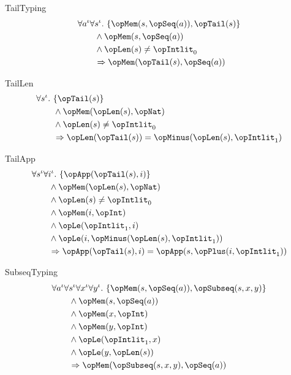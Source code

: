 \documentclass[11pt, a4paper, oneside]{article}
\begin{document}
\begin{axioms}
\item[TailTyping] \[
        \begin{aligned}
            &\forall a^\idv \forall s^\idv.\, \st{ \opMem(s, \opSeq(a)), \opTail(s) } \\
            &\qquad \wedge \opMem(s, \opSeq(a)) \\
            &\qquad \wedge \opLen(s) \neq \opIntlit_0 \\
            &\qquad \imp \opMem(\opTail(s), \opSeq(a))
        \end{aligned}
    \]

\item[TailLen] \[
        \begin{aligned}
            &\forall s^\idv.\, \st{ \opTail(s) } \\
            &\qquad \wedge \opMem(\opLen(s), \opNat) \\
            &\qquad \wedge \opLen(s) \neq \opIntlit_0 \\
            &\qquad \imp \opLen(\opTail(s)) = \opMinus(\opLen(s), \opIntlit_1)
        \end{aligned}
    \]

\item[TailApp] \[
        \begin{aligned}
            &\forall s^\idv \forall i^\idv.\, \st{ \opApp(\opTail(s), i) } \\
            &\qquad \wedge \opMem(\opLen(s), \opNat) \\
            &\qquad \wedge \opLen(s) \neq \opIntlit_0 \\
            &\qquad \wedge \opMem(i, \opInt) \\
            &\qquad \wedge \opLe(\opIntlit_1, i) \\
            &\qquad \wedge \opLe(i, \opMinus(\opLen(s), \opIntlit_1)) \\
            &\qquad \imp \opApp(\opTail(s), i) = \opApp(s, \opPlus(i, \opIntlit_1))
        \end{aligned}
    \]

\item[SubseqTyping] \[
        \begin{aligned}
            &\forall a^\idv \forall s^\idv \forall x^\idv \forall y^\idv.\, \st{ \opMem(s, \opSeq(a)), \opSubseq(s, x, y) } \\
            &\qquad \wedge \opMem(s, \opSeq(a)) \\
            &\qquad \wedge \opMem(x, \opInt) \\
            &\qquad \wedge \opMem(y, \opInt) \\
            &\qquad \wedge \opLe(\opIntlit_1, x) \\
            &\qquad \wedge \opLe(y, \opLen(s)) \\
            &\qquad \imp \opMem(\opSubseq(s, x, y), \opSeq(a))
        \end{aligned}
    \]


\end{axioms}
\end{document}

